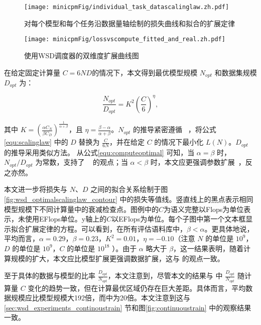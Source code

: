 \begin{figure}
    \centering
    \texttt{[image: minicpmFig/individual\_task\_datascalinglaw.zh.pdf]}
    \caption{对每个模型和每个任务沿数据量轴绘制的损失曲线和拟合的扩展定律}
    \label{fig:individual_task_datascalinglaw}
\end{figure}


\begin{figure}[!t]
    \centering
    \texttt{[image: minicpmFig/lossvscompute\_fitted\_and\_real.zh.pdf]}
    \caption{使用WSD调度器的双维度扩展曲线图}
    \label{fig:wsd_optimalscalinglaw}
\end{figure}

在给定固定计算量 $C = 6ND$的情况下，本文得到最优模型规模 $N_{opt}$ 和数据集规模 $D_{opt}$ 为： 

\begin{equation}
    \frac{N_{opt}}{D_{opt}} = K^2\left(\frac{C}{6}\right)^{\eta},
\label{equ:computeoptimal}
\end{equation}


其中 $K = (\frac{\alpha C_N}{\beta C_D})^{\frac{1}{\alpha + \beta}} $，且 $\eta=\frac{\beta - \alpha}{\alpha + \beta}$。$N_{opt}$ 的推导紧密遵循 ~\cite{hoffmann2022training}，将公式\ref{equ:scalinglaw} 中的 $D$ 替换为 $\frac{C}{6N}$，并在给定 $C$ 的情况下最小化 $L(N)$。$D_{opt}$ 的推导采用类似方法。 
从公式\ref{equ:computeoptimal} 可知，当 $\alpha = \beta$ 时，$N_{opt}/D_{opt}$ 为常数，支持了 ~\citet{hoffmann2022training} 的观点；当 $\alpha < \beta$ 时，本文应更强调参数扩展~\citep{kaplan2020scaling}，反之亦然。 

本文进一步将损失与 $N$、$D$ 之间的拟合关系绘制于图\ref{fig:wsd_optimalscalinglaw_contour} 中的损失等值线。竖直线上的黑点表示相同模型规模下不同计算量中的衰减检查点。图例中的$C$为语义完整以Flops为单位表示，未使用EFlops单位。y轴上的$C$以EFlops为单位。每个子图中第一个文本框显示拟合扩展定律的方程。可以看到，在所有评估语料库中，$\beta < \alpha$。更具体地说，平均而言，$\alpha = 0.29$，$\beta = 0.23$，$K^2 = 0.01$，$\eta = -0.10$（注意 $N$ 的单位是 $10^9$，$D$ 的单位是 $10^9$，$C$ 的单位是 $10^{18}$ ）。由于 $\alpha$ 略大于 $\beta$，这一结果表明，随着计算规模的扩大，本文应比模型扩展更强调数据扩展，这与\citet{hoffmann2022training} 的观点一致。

至于具体的数据与模型的比率 $\frac{D_{opt}}{N_{opt}}$，本文注意到，尽管本文的结果与 \citet{hoffmann2022training} 中 $\frac{D_{opt}}{N_{opt}}$ 随计算量 $C$ 变化的趋势一致，但在计算最优区域仍存在巨大差距。具体而言，平均数据规模应比模型规模大192倍，而\citet{hoffmann2022training}中为20倍。本文注意到这与\ref{sec:wsd_experiments_continoustrain} 节和图\ref{fig:continuoustrain} 中的观察结果一致。




